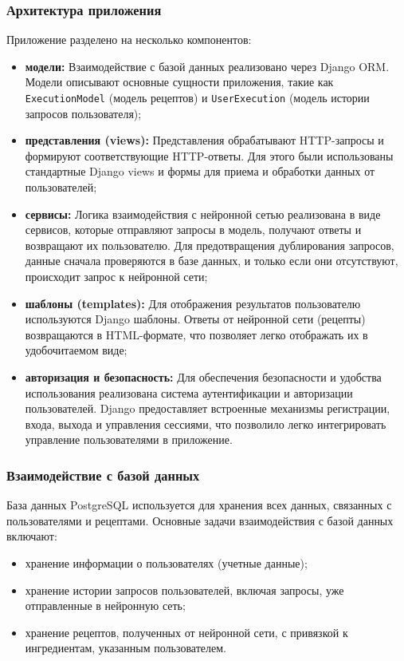 {\subsubsection*{Архитектура приложения}
Приложение разделено на несколько компонентов:
\begin{itemize}
    \item \textbf{модели:} Взаимодействие с базой данных реализовано через Django ORM. Модели описывают основные сущности приложения, такие как \texttt{ExecutionModel} (модель рецептов) и \texttt{UserExecution} (модель истории запросов пользователя);
    \item \textbf{представления (views):} Представления обрабатывают HTTP-запросы и формируют соответствующие HTTP-ответы. Для этого были использованы стандартные Django views и формы для приема и обработки данных от пользователей;
    \item \textbf{сервисы:} Логика взаимодействия с нейронной сетью реализована в виде сервисов, которые отправляют запросы в модель, получают ответы и возвращают их пользователю. Для предотвращения дублирования запросов, данные сначала проверяются в базе данных, и только если они отсутствуют, происходит запрос к нейронной сети;
    \item \textbf{шаблоны (templates):} Для отображения результатов пользователю используются Django шаблоны. Ответы от нейронной сети (рецепты) возвращаются в HTML-формате, что позволяет легко отображать их в удобочитаемом виде;
    \item \textbf{авторизация и безопасность:} Для обеспечения безопасности и удобства использования реализована система аутентификации и авторизации пользователей. Django предоставляет встроенные механизмы регистрации, входа, выхода и управления сессиями, что позволило легко интегрировать управление пользователями в приложение.
\end{itemize}

\subsubsection*{Взаимодействие с базой данных}
База данных PostgreSQL используется для хранения всех данных, связанных с пользователями и рецептами. Основные задачи взаимодействия с базой данных включают:
\begin{itemize}
    \item хранение информации о пользователях (учетные данные);
    \item хранение истории запросов пользователей, включая запросы, уже отправленные в нейронную сеть;
    \item хранение рецептов, полученных от нейронной сети, с привязкой к ингредиентам, указанным пользователем.
\end{itemize}

}
